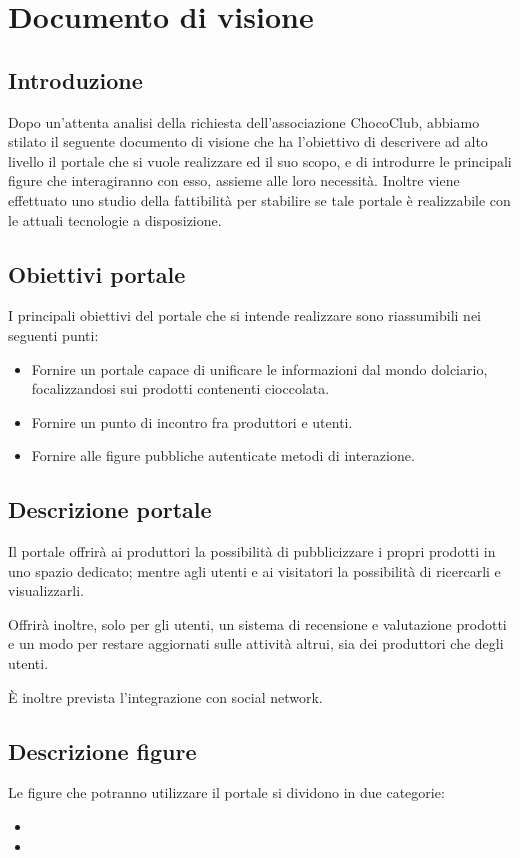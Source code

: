 \chapter{Documento di visione} 
\label{cha:documento_di_visione}

\section{Introduzione}
\label{sec:introduzione}
Dopo un'attenta analisi della richiesta dell'associazione ChocoClub, abbiamo stilato il seguente documento di visione che ha l'obiettivo di descrivere ad alto livello il portale che si vuole realizzare ed il suo scopo, e di introdurre le principali figure che interagiranno con esso, assieme alle loro necessità. Inoltre viene effettuato uno studio della fattibilità per stabilire se tale portale è realizzabile con le attuali tecnologie a disposizione.

\section{Obiettivi portale} 
\label{sec:descrizione_portale}
I principali obiettivi del portale che si intende realizzare sono riassumibili nei seguenti punti:
\begin{itemize}
	\item Fornire un portale capace di unificare le informazioni dal mondo dolciario, focalizzandosi sui prodotti contenenti cioccolata.
	\item Fornire un punto di incontro fra produttori e utenti.
	\item Fornire alle figure pubbliche autenticate metodi di interazione.
\end{itemize}

\section{Descrizione portale}
\label{sec:descrizione_portale}
Il portale offrirà ai produttori la possibilità di pubblicizzare i propri prodotti in uno spazio dedicato; mentre agli utenti e ai visitatori la possibilità di ricercarli e visualizzarli. 

Offrirà inoltre, solo per gli utenti, un sistema di recensione e valutazione prodotti e un modo per restare aggiornati sulle attività altrui, sia dei produttori che degli utenti.

È inoltre prevista l'integrazione con social network.

\section{Descrizione figure} 
\label{sec:descrizione_figure}
Le figure che potranno utilizzare il portale si dividono in due categorie:
\begin{itemize}
	\item {}
	\item {}
\end{itemize}

